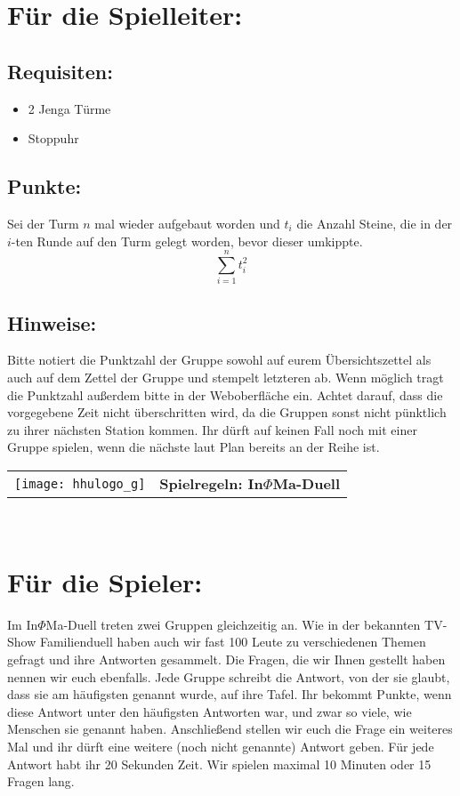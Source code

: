 \documentclass[a4paper,10pt]{article}
\def\spield{In$\Phi $Ma-Duell}
\newcommand{\unten}{
 Bitte notiert die Punktzahl der Gruppe sowohl auf eurem Übersichtszettel als auch auf dem Zettel der Gruppe und stempelt letzteren ab. Wenn möglich tragt die Punktzahl außerdem bitte in der Weboberfläche ein.
 Achtet darauf, dass die vorgegebene Zeit nicht überschritten wird, da die Gruppen sonst nicht pünktlich zu ihrer nächsten Station kommen. Ihr dürft auf keinen Fall noch mit einer Gruppe spielen, wenn die nächste laut Plan bereits an der Reihe ist.
}
\begin{document}
\section*{Für die Spielleiter:}
\subsection*{Requisiten:}
\begin{itemize}
 \item 2 Jenga Türme
 \item Stoppuhr
\end{itemize}
\subsection*{Punkte:}
Sei der Turm $n$ mal wieder aufgebaut worden und $t_i$ die Anzahl Steine, die in der $i$-ten Runde auf den Turm gelegt worden, bevor dieser umkippte.
 $$\sum_{i=1}^{n}t_i^2$$

\subsection*{Hinweise:}
\unten

\newpage


  \begin{tabularx}{\textwidth}{lc}
    \texttt{[image: hhulogo\_g]}
  & {\Huge \textbf{Spielregeln: \spield}}
  \end{tabularx}\\

\Large
\section*{Für die Spieler:}
Im In$\Phi$Ma-Duell treten zwei Gruppen gleichzeitig an. Wie in der bekannten TV-Show Familienduell haben auch wir fast 100 Leute zu verschiedenen Themen gefragt und ihre Antworten gesammelt. Die Fragen, die wir Ihnen gestellt haben nennen wir euch ebenfalls. Jede Gruppe schreibt die Antwort, von der sie glaubt, dass sie am häufigsten genannt wurde, auf ihre Tafel. Ihr bekommt Punkte, wenn diese Antwort unter den häufigsten Antworten war, und zwar so viele, wie Menschen sie genannt haben. Anschließend stellen wir euch die Frage ein weiteres Mal und ihr dürft eine weitere (noch nicht genannte) Antwort geben. Für jede Antwort habt ihr 20 Sekunden Zeit. Wir spielen maximal 10 Minuten oder 15 Fragen lang.
\end{document}
